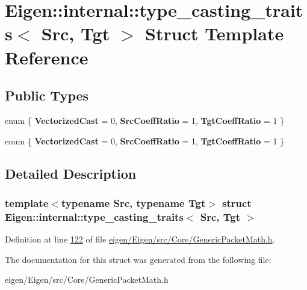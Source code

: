 \hypertarget{struct_eigen_1_1internal_1_1type__casting__traits}{}\section{Eigen\+:\+:internal\+:\+:type\+\_\+casting\+\_\+traits$<$ Src, Tgt $>$ Struct Template Reference}
\label{struct_eigen_1_1internal_1_1type__casting__traits}
\subsection*{Public Types}
\begin{DoxyCompactItemize}
\item 
\mbox{\label{struct_eigen_1_1internal_1_1type__casting__traits_a7bdfc3179d8570649964ed20928e674b}} 
enum \{ {\bfseries Vectorized\+Cast} = 0, 
{\bfseries Src\+Coeff\+Ratio} = 1, 
{\bfseries Tgt\+Coeff\+Ratio} = 1
 \}
\item 
\mbox{\label{struct_eigen_1_1internal_1_1type__casting__traits_aa9a8fe4f5d982b0e832408967e02a8a4}} 
enum \{ {\bfseries Vectorized\+Cast} = 0, 
{\bfseries Src\+Coeff\+Ratio} = 1, 
{\bfseries Tgt\+Coeff\+Ratio} = 1
 \}
\end{DoxyCompactItemize}


\subsection{Detailed Description}
\subsubsection*{template$<$typename Src, typename Tgt$>$\newline
struct Eigen\+::internal\+::type\+\_\+casting\+\_\+traits$<$ Src, Tgt $>$}



Definition at line \hyperlink{eigen_2_eigen_2src_2_core_2_generic_packet_math_8h_source_l00122}{122} of file \hyperlink{eigen_2_eigen_2src_2_core_2_generic_packet_math_8h_source}{eigen/\+Eigen/src/\+Core/\+Generic\+Packet\+Math.\+h}.



The documentation for this struct was generated from the following file\+:\begin{DoxyCompactItemize}
\item 
eigen/\+Eigen/src/\+Core/\+Generic\+Packet\+Math.\+h\end{DoxyCompactItemize}
